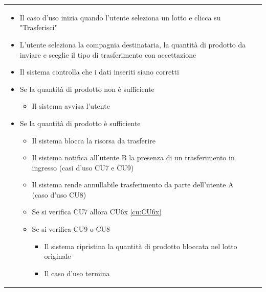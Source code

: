 \documentclass[a4paper,11pt]{article}
\begin{document}
\begin{longtable}{|p{2cm}|p{13cm}|}
  \begin{itemize}
    \item Il caso d'uso inizia quando l'utente seleziona un lotto e clicca su "Trasferisci"
    \item L'utente seleziona la compagnia destinataria, la quantità di prodotto da inviare e sceglie il tipo di trasferimento con accettazione
    \item Il sistema controlla che i dati inseriti siano corretti
    \item Se la quantità di prodotto non è sufficiente
          \begin{itemize}
            \item Il sistema avvisa l'utente
          \end{itemize}
    \item Se la quantità di prodotto è sufficiente
          \begin{itemize}
            \item Il sistema blocca la risorsa da trasferire
            \item Il sistema notifica all'utente B la presenza di un trasferimento in ingresso (casi d'uso CU7 e CU9)
            \item Il sistema rende annullabile trasferimento da parte dell'utente A (caso d'uso CU8)
            \item Se si verifica CU7 allora CU6x \ref{cu:CU6x}
            \item Se si verifica CU9 o CU8
                  \begin{itemize}
                    \item Il sistema ripristina la quantità di prodotto bloccata nel lotto originale
                    \item Il caso d'uso termina
                  \end{itemize}
          \end{itemize}
  \end{itemize}


\end{longtable}
\end{document}
